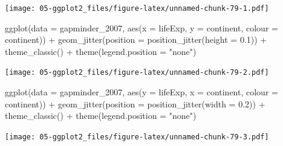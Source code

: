 \documentclass[
]{book}
\newenvironment{Shaded}{\begin{snugshade}}{\end{snugshade}}
\newcommand{\AttributeTok}[1]{\textcolor[rgb]{0.77,0.63,0.00}{#1}}
\newcommand{\FloatTok}[1]{\textcolor[rgb]{0.00,0.00,0.81}{#1}}
\newcommand{\FunctionTok}[1]{\textcolor[rgb]{0.00,0.00,0.00}{#1}}
\newcommand{\NormalTok}[1]{#1}
\newcommand{\SpecialCharTok}[1]{\textcolor[rgb]{0.00,0.00,0.00}{#1}}
\newcommand{\StringTok}[1]{\textcolor[rgb]{0.31,0.60,0.02}{#1}}
\begin{document}
\texttt{[image: 05-ggplot2\_files/figure-latex/unnamed-chunk-79-1.pdf]}

\begin{Shaded}
\begin{Highlighting}[]


\FunctionTok{ggplot}\NormalTok{(}\AttributeTok{data =}\NormalTok{ gapminder\_2007, }\FunctionTok{aes}\NormalTok{(}\AttributeTok{x =}\NormalTok{ lifeExp, }\AttributeTok{y =}\NormalTok{ continent, }\AttributeTok{colour =}\NormalTok{ continent)) }\SpecialCharTok{+} 
   \FunctionTok{geom\_jitter}\NormalTok{(}\AttributeTok{position =} \FunctionTok{position\_jitter}\NormalTok{(}\AttributeTok{height =} \FloatTok{0.1}\NormalTok{)) }\SpecialCharTok{+}
   \FunctionTok{theme\_classic}\NormalTok{() }\SpecialCharTok{+}
   \FunctionTok{theme}\NormalTok{(}\AttributeTok{legend.position =} \StringTok{"none"}\NormalTok{)}
\end{Highlighting}
\end{Shaded}

\texttt{[image: 05-ggplot2\_files/figure-latex/unnamed-chunk-79-2.pdf]}

\begin{Shaded}
\begin{Highlighting}[]


\FunctionTok{ggplot}\NormalTok{(}\AttributeTok{data =}\NormalTok{ gapminder\_2007, }\FunctionTok{aes}\NormalTok{(}\AttributeTok{y =}\NormalTok{ lifeExp, }\AttributeTok{x =}\NormalTok{ continent, }\AttributeTok{colour =}\NormalTok{ continent)) }\SpecialCharTok{+} 
   \FunctionTok{geom\_jitter}\NormalTok{(}\AttributeTok{position =} \FunctionTok{position\_jitter}\NormalTok{(}\AttributeTok{width =} \FloatTok{0.2}\NormalTok{)) }\SpecialCharTok{+}
   \FunctionTok{theme\_classic}\NormalTok{() }\SpecialCharTok{+}
   \FunctionTok{theme}\NormalTok{(}\AttributeTok{legend.position =} \StringTok{"none"}\NormalTok{)}
\end{Highlighting}
\end{Shaded}

\texttt{[image: 05-ggplot2\_files/figure-latex/unnamed-chunk-79-3.pdf]}
\end{document}
